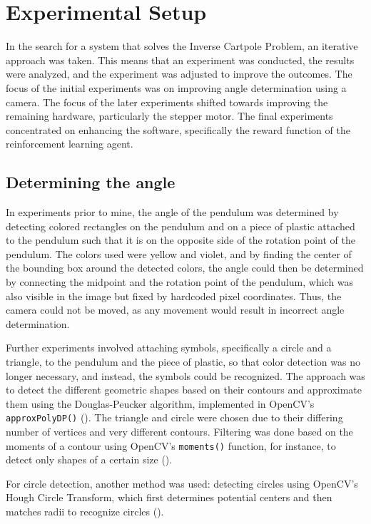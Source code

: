 \chapter{Experimental Setup}

In the search for a system that solves the Inverse Cartpole Problem, an iterative approach was taken. This means that an experiment was conducted, the results were analyzed, and the experiment was adjusted to improve the outcomes. The focus of the initial experiments was on improving angle determination using a camera. The focus of the later experiments shifted towards improving the remaining hardware, particularly the stepper motor. The final experiments concentrated on enhancing the software, specifically the reward function of the reinforcement learning agent.

\section{Determining the angle} \label{sec:determining_the_angle}
In experiments prior to mine, the angle of the pendulum was determined by detecting colored rectangles on the pendulum and on a piece of plastic attached to the pendulum such that it is on the opposite side of the rotation point of the pendulum. The colors used were yellow and violet, and by finding the center of the bounding box around the detected colors, the angle could then be determined by connecting the midpoint and the rotation point of the pendulum, which was also visible in the image but fixed by hardcoded pixel coordinates. Thus, the camera could not be moved, as any movement would result in incorrect angle determination.

Further experiments involved attaching symbols, specifically a circle and a triangle, to the pendulum and the piece of plastic, so that color detection was no longer necessary, and instead, the symbols could be recognized. The approach was to detect the different geometric shapes based on their contours and approximate them using the Douglas-Peucker algorithm, implemented in OpenCV's \texttt{approxPolyDP()} (\cite{opencv_team_opencv_nodate-1}). The triangle and circle were chosen due to their differing number of vertices and very different contours. Filtering was done based on the moments of a contour using OpenCV's \texttt{moments()} function, for instance, to detect only shapes of a certain size (\cite{opencv_team_opencv_nodate-2}).

For circle detection, another method was used: detecting circles using OpenCV's Hough Circle Transform, which first determines potential centers and then matches radii to recognize circles (\cite{opencv_team_opencv_nodate}).


